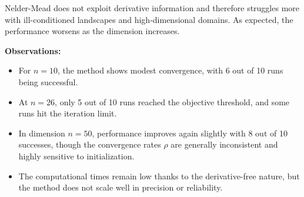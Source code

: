 \documentclass[a4paper,12pt]{article}
\begin{document}
	Nelder-Mead does not exploit derivative information and therefore struggles more with ill-conditioned landscapes and high-dimensional domains. As expected, the performance worsens as the dimension increases.
	
	\vspace{1em}
	\textbf{Observations:}
	\begin{itemize}
		\item For $n=10$, the method shows modest convergence, with 6 out of 10 runs being successful.
		\item At $n=26$, only 5 out of 10 runs reached the objective threshold, and some runs hit the iteration limit.
		\item In dimension $n=50$, performance improves again slightly with 8 out of 10 successes, though the convergence rates $\rho$ are generally inconsistent and highly sensitive to initialization.
		\item The computational times remain low thanks to the derivative-free nature, but the method does not scale well in precision or reliability.
	\end{itemize}
	
\end{document}
